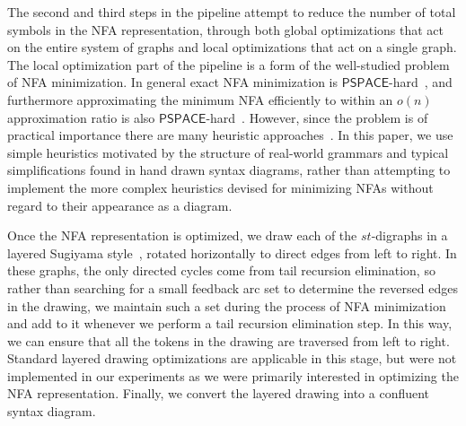 \documentclass[10pt]{llncs}
\begin{document}
The second and third steps in the pipeline attempt to reduce the number of total symbols in the NFA representation, through both global optimizations that act on the entire system of graphs and local optimizations that act on a single graph. The local optimization part of the pipeline is a form of the well-studied problem of NFA minimization. In general exact NFA minimization is $\mathsf{PSPACE}$-hard~\cite{HunRosSzy-JCSS-1976, StoMey-STOC-1973}, and furthermore approximating the minimum NFA efficiently to within an $o(n)$ approximation ratio is also $\mathsf{PSPACE}$-hard~\cite{GraSch-JCSS--2007}. However, since the problem is of practical importance there are many heuristic approaches~\cite{ChaCou-TCS-2004, HanWoo-TCS-2007}. In this paper, we use simple heuristics motivated by the structure of real-world grammars and typical simplifications found in hand drawn syntax diagrams, rather than attempting to implement the more complex heuristics devised for minimizing NFAs without regard to their appearance as a diagram.

Once the NFA representation is optimized, we draw each of the $st$-digraphs in a layered Sugiyama style~\cite{SugTagSho-SMC-1981,BasMat-DGMM-01}, rotated horizontally to direct edges from left to right. In these graphs, the only directed cycles come from tail recursion elimination, so rather than searching for a small feedback arc set to determine the reversed edges in the drawing, we maintain such a set during the process of NFA minimization and add to it whenever we perform a tail recursion elimination step. In this way, we can ensure that all the tokens in the drawing are traversed from left to right. Standard layered drawing optimizations are applicable in this stage, but were not implemented in our experiments as we were primarily interested in optimizing the NFA representation. Finally, we convert the layered drawing into a confluent syntax diagram.
\end{document}

